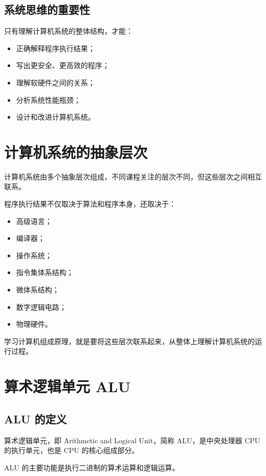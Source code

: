 \documentclass[12pt,a4paper]{ctexart}
\begin{document}
\subsection{系统思维的重要性}

只有理解计算机系统的整体结构，才能：

\begin{itemize}
    \item 正确解释程序执行结果；
    \item 写出更安全、更高效的程序；
    \item 理解软硬件之间的关系；
    \item 分析系统性能瓶颈；
    \item 设计和改进计算机系统。
\end{itemize}

\section{计算机系统的抽象层次}

计算机系统由多个抽象层次组成，不同课程关注的层次不同，但这些层次之间相互联系。

程序执行结果不仅取决于算法和程序本身，还取决于：

\begin{itemize}
    \item 高级语言；
    \item 编译器；
    \item 操作系统；
    \item 指令集体系结构；
    \item 微体系结构；
    \item 数字逻辑电路；
    \item 物理硬件。
\end{itemize}

学习计算机组成原理，就是要将这些层次联系起来，从整体上理解计算机系统的运行过程。

\section{算术逻辑单元 ALU}

\subsection{ALU 的定义}

算术逻辑单元，即 Arithmetic and Logical Unit，简称 ALU，是中央处理器 CPU 的执行单元，也是 CPU 的核心组成部分。

ALU 的主要功能是执行二进制的算术运算和逻辑运算。
\end{document}
